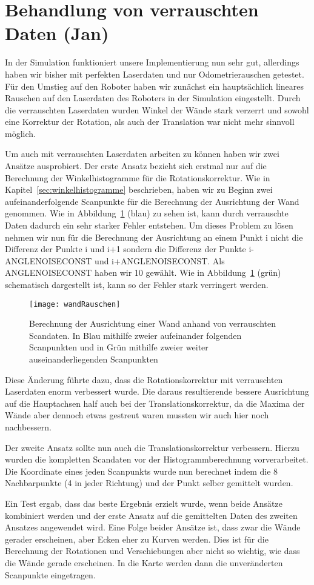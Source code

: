 \section{Behandlung von verrauschten Daten (Jan)}

In der Simulation funktioniert unsere Implementierung nun sehr gut, allerdings haben wir bisher mit perfekten Laserdaten und nur Odometrierauschen getestet. Für den Umstieg auf den Roboter haben wir zunächst ein hauptsächlich lineares Rauschen auf den Laserdaten des Roboters in der Simulation eingestellt. Durch die verrauschten Laserdaten wurden Winkel der Wände stark verzerrt und sowohl eine Korrektur der Rotation, als auch der Translation war nicht mehr sinnvoll möglich.


Um auch mit verrauschten Laserdaten arbeiten zu können haben wir zwei Ansätze ausprobiert. Der erste Ansatz bezieht sich erstmal nur auf die Berechnung der Winkelhistogramme für die Rotationskorrektur. Wie in Kapitel~\ref{sec:winkelhistogramme} beschrieben, haben wir zu Beginn zwei aufeinanderfolgende Scanpunkte für die Berechnung der Ausrichtung der Wand genommen. Wie in Abbildung~\ref{fig:wandRauschen} (blau) zu sehen ist, kann durch verrauschte Daten dadurch ein sehr starker Fehler entstehen. Um dieses Problem zu lösen nehmen wir nun für die Berechnung der Ausrichtung an einem Punkt i nicht die Differenz der Punkte i und i+1 sondern die Differenz der Punkte i-ANGLENOISECONST und i+ANGLENOISECONST. Als ANGLENOISECONST haben wir 10 gewählt. Wie in Abbildung~\ref{fig:wandRauschen} (grün) schematisch dargestellt ist, kann so der Fehler stark verringert werden.

\begin{figure}
	\centering
	\texttt{[image: wandRauschen]}
	\caption{Berechnung der Ausrichtung einer Wand anhand von verrauschten Scandaten. In Blau mithilfe zweier aufeinander folgenden Scanpunkten und in Grün mithilfe zweier weiter auseinanderliegenden Scanpunkten}
	\label{fig:wandRauschen}
\end{figure}

Diese Änderung führte dazu, dass die Rotationskorrektur mit verrauschten Laserdaten enorm verbessert wurde. Die daraus resultierende bessere Ausrichtung auf die Hauptachsen half auch bei der Translationskorrektur, da die Maxima der Wände aber dennoch etwas gestreut waren mussten wir auch hier noch nachbessern.

Der zweite Ansatz sollte nun auch die Translationskorrektur verbessern. Hierzu wurden die kompletten Scandaten vor der Histogrammberechnung vorverarbeitet. Die Koordinate eines jeden Scanpunkts wurde nun berechnet indem die 8 Nachbarpunkte (4 in jeder Richtung) und der Punkt selber gemittelt wurden.

Ein Test ergab, dass das beste Ergebnis erzielt wurde, wenn beide Ansätze kombiniert werden und der erste Ansatz auf die gemittelten Daten des zweiten Ansatzes angewendet wird. Eine Folge beider Ansätze ist, dass zwar die Wände gerader erscheinen, aber Ecken eher zu Kurven werden. Dies ist für die Berechnung der Rotationen und Verschiebungen aber nicht so wichtig, wie dass die Wände gerade erscheinen. In die Karte werden dann die unveränderten Scanpunkte eingetragen.